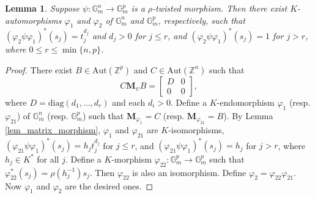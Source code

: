 \documentclass[12pt]{amsart}
\theoremstyle{plain}
\newtheorem{lemma}[theorem]{Lemma}
\theoremstyle{definition}
\theoremstyle{question}
\theoremstyle{remark}
\theoremstyle{assumption}
\numberwithin{equation}{section}
\theoremstyle{bigthm}
\begin{document}
\begin{lemma}\label{lem_tori_morphism}
Suppose $\psi \colon  \mathbb{G}_{m}^{n} \rightarrow \mathbb{G}_{m}^{p}$ is a $\rho$-twisted morphism. Then there exist $K$-automorphisms $\varphi_{1}$ and $\varphi_{2}$ of $\mathbb{G}_{m}^{n}$ and $\mathbb{G}_{m}^{p}$, respectively, such that $(\varphi_{2} \psi \varphi_{1})^{*} (s_{j}) = t_{j}^{d_{j}}$ and $d_{j} >0$ for $j \le r$, and $(\varphi_{2} \psi \varphi_{1})^{*} (s_{j}) = 1$ for $j>r$, where $0 \leq r \leq \min\{n, p \}$.
\end{lemma}
\begin{proof}
There exist $B \in \mathrm{Aut} (\mathbb{Z}^{p})$ and $C \in \mathrm{Aut} (\mathbb{Z}^{n})$ such that
\[
C \mathbf{M}_{\psi} B =
\begin{bmatrix}
D & 0 \\
0 & 0
\end{bmatrix},
\]
where $D = \mathrm{diag} (d_{1}, \dots, d_{r})$ and each $d_{i} >0$. Define a $K$-endomorphism $\varphi_{1}$ (resp. $\varphi_{21}$) of $\mathbb{G}_{m}^{n}$ (resp. $\mathbb{G}_{m}^{p}$) such that $\mathbf{M}_{\varphi_{1}} = C$ (resp. $\mathbf{M}_{\varphi_{21}} = B$). By Lemma \ref{lem_matrix_morphism}, $\varphi_{1}$ and $\varphi_{21}$ are $K$-isomorphisms, $(\varphi_{21} \psi \varphi_{1})^{*} (s_{j}) = h_{j} t_{j}^{d_{j}}$ for $j \leq r$, and $(\varphi_{21} \psi \varphi_{1})^{*} (s_{j}) = h_{j}$ for $j >r$, where $h_{j} \in K^{*}$ for all $j$. Define a $K$-morphism $\varphi_{22} \colon  \mathbb{G}_{m}^{p} \rightarrow \mathbb{G}_{m}^{p}$ such that $\varphi_{22}^{*} (s_{j}) = \rho (h_{j}^{-1}) s_{j}$. Then $\varphi_{22}$ is also an isomorphism. Define $\varphi_{2} = \varphi_{22} \varphi_{21}$. Now $\varphi_{1}$ and $\varphi_{2}$ are the desired ones.
\end{proof}
\end{document}
